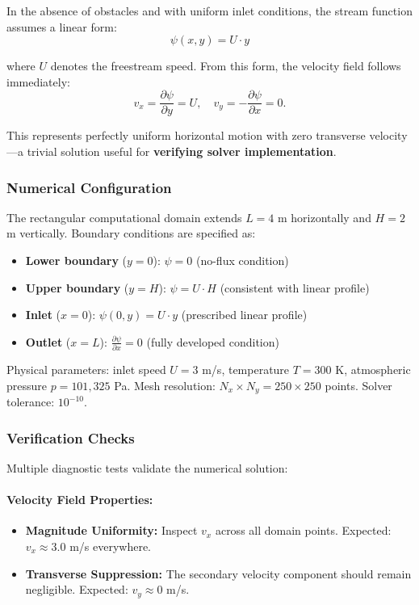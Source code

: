 In the absence of obstacles and with uniform inlet conditions, the stream function assumes a linear form:
\begin{equation}
\psi(x, y) = U \cdot y
\end{equation}

where $U$ denotes the freestream speed. From this form, the velocity field follows immediately:
\begin{equation}
v_x = \frac{\partial \psi}{\partial y} = U, \quad v_y = -\frac{\partial \psi}{\partial x} = 0.
\end{equation}

This represents perfectly uniform horizontal motion with zero transverse velocity—a trivial solution useful for \textbf{verifying solver implementation}.

\subsubsection{Numerical Configuration}

The rectangular computational domain extends $L = 4$ m horizontally and $H = 2$ m vertically. Boundary conditions are specified as:
\begin{itemize}
    \item \textbf{Lower boundary} ($y = 0$): $\psi = 0$ (no-flux condition)
    \item \textbf{Upper boundary} ($y = H$): $\psi = U \cdot H$ (consistent with linear profile)
    \item \textbf{Inlet} ($x = 0$): $\psi(0, y) = U \cdot y$ (prescribed linear profile)
    \item \textbf{Outlet} ($x = L$): $\frac{\partial \psi}{\partial x} = 0$ (fully developed condition)
\end{itemize}

Physical parameters: inlet speed $U = 3$ m/s, temperature $T = 300$ K, atmospheric pressure $p = 101,325$ Pa. Mesh resolution: $N_x \times N_y = 250 \times 250$ points. Solver tolerance: $10^{-10}$.

\subsubsection{Verification Checks}

Multiple diagnostic tests validate the numerical solution:

\paragraph{Velocity Field Properties:}
\begin{itemize}
    \item \textbf{Magnitude Uniformity:} Inspect $v_x$ across all domain points. Expected: $v_x \approx 3.0$ m/s everywhere.
    \item \textbf{Transverse Suppression:} The secondary velocity component should remain negligible. Expected: $v_y \approx 0$ m/s.
\end{itemize}

